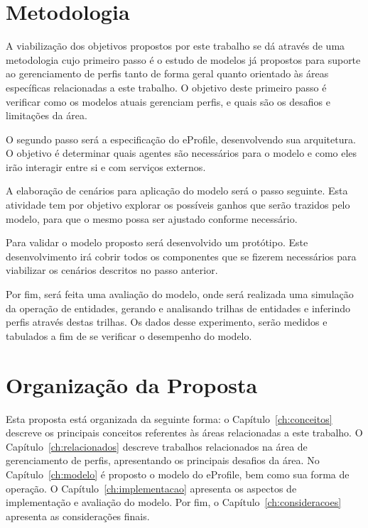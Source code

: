 
\section{Metodologia}
\label{sec:metodologia}

A viabilização dos objetivos propostos por este trabalho se dá através de uma metodologia cujo primeiro passo é o estudo de modelos já propostos para suporte ao gerenciamento de perfis tanto de forma geral quanto orientado às áreas específicas relacionadas a este trabalho. O objetivo deste primeiro passo é verificar como os modelos atuais gerenciam perfis, e quais são os desafios e limitações da área.

O segundo passo será a especificação do eProfile, desenvolvendo sua arquitetura. O objetivo é determinar quais agentes são necessários para o modelo e como eles irão interagir entre si e com serviços externos.

A elaboração de cenários para aplicação do modelo será o passo seguinte. Esta atividade tem por objetivo explorar os possíveis ganhos que serão trazidos pelo modelo, para que o mesmo possa ser ajustado conforme necessário.

Para validar o modelo proposto será desenvolvido um protótipo. Este desenvolvimento irá cobrir todos os componentes que se fizerem necessários para viabilizar os cenários descritos no passo anterior.

Por fim, será feita uma avaliação do modelo, onde será realizada uma simulação da operação de entidades, gerando e analisando trilhas de entidades e inferindo perfis através destas trilhas. Os dados desse experimento, serão medidos e tabulados a fim de se verificar o desempenho do modelo.


\section{Organização da Proposta}
\label{sec:organizacao}

Esta proposta está organizada da seguinte forma: o Capítulo~\ref{ch:conceitos} descreve os principais conceitos referentes às áreas relacionadas a este trabalho. O Capítulo~\ref{ch:relacionados} descreve trabalhos relacionados na área de gerenciamento de perfis, apresentando os principais desafios da área. No Capítulo~\ref{ch:modelo} é proposto o modelo do eProfile, bem como sua forma de operação. O Capítulo~\ref{ch:implementacao} apresenta os aspectos de implementação e avaliação do modelo. Por fim, o Capítulo~\ref{ch:consideracoes} apresenta as considerações finais.
